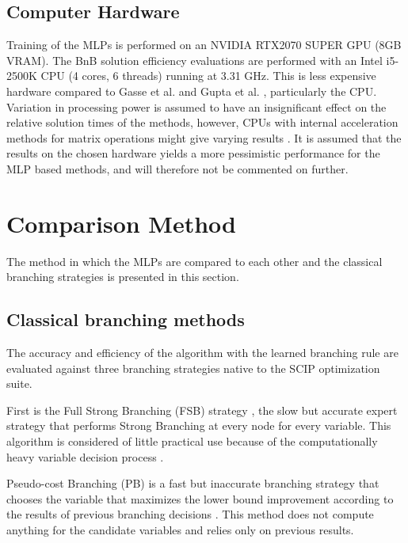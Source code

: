 \subsection{Computer Hardware}

Training of the \gls{MLP}s is performed on an NVIDIA RTX2070 SUPER GPU (8GB VRAM). The \gls{BnB} solution efficiency evaluations are performed with an Intel i5-2500K \gls{CPU} (4 cores, 6 threads) running at 3.31 GHz. This is less expensive hardware compared to Gasse et al. \cite{gasse2019exact} and Gupta et al. \cite{gupta2020hybrid}, particularly the CPU. Variation in processing power is assumed to have an insignificant effect on the relative solution times of the methods, however, CPUs with internal acceleration methods for matrix operations might give varying results \cite{vanhoucke2011improving}. It is assumed that the results on the chosen hardware yields a more pessimistic performance for the \gls{MLP} based methods, and will therefore not be commented on further.   


\section{Comparison Method}

The method in which the \gls{MLP}s are compared to each other and the classical branching strategies is presented in this section.


\subsection{Classical branching methods}

The accuracy and efficiency of the algorithm with the learned branching rule are evaluated against three branching strategies native to the \gls{SCIP} optimization suite. 

First is the Full Strong Branching (\gls{FSB}) strategy \cite{applegate1995finding}, the slow but accurate expert strategy that performs Strong Branching at every node for every variable. This algorithm is considered of little practical use because of the computationally heavy variable decision process \cite{achterberg2004branching}.

Pseudo-cost Branching (PB) is a fast but inaccurate branching strategy \cite{gamrath2018measuring} that chooses the variable that maximizes the lower bound improvement according to the results of previous branching decisions \cite{benchiou1971experiments}. This method does not compute anything for the candidate variables and relies only on previous results. 

